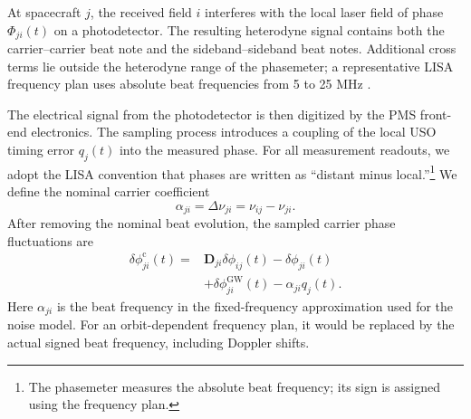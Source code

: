 At spacecraft $j$, the received field $i$ interferes with the local laser field of phase $\Phi_{ji}(t)$ on a photodetector. The resulting heterodyne signal contains both the carrier–carrier beat note and the sideband–sideband beat notes. Additional cross terms lie outside the heterodyne range of the phasemeter; a representative LISA frequency plan uses absolute beat frequencies from 5 to 25 MHz \cite{heinzel_frequency_2024}.

The electrical signal from the photodetector is then digitized by the \ac{PMS} front-end electronics. The sampling process introduces a coupling of the local USO timing error $q_j(t)$ into the measured phase.
For all measurement readouts, we adopt the LISA convention that phases are written as ``distant minus local.''\footnote{The phasemeter measures the absolute beat frequency; its sign is assigned using the frequency plan.} We define the nominal carrier coefficient
\begin{equation}
    \alpha_{ji}=\Delta\nu_{ji}=\nu_{ij}-\nu_{ji}.
\end{equation}
After removing the nominal beat evolution, the sampled carrier phase fluctuations are
\begin{equation}\label{Main_LISA_eq}
    \begin{aligned}
    \delta\phi^{\mathrm c}_{ji}(t)={}&\mathbf D_{ji}\delta\phi_{ij}(t)-\delta\phi_{ji}(t)\\
    &+\delta\phi^{\mathrm{GW}}_{ji}(t)-\alpha_{ji}q_j(t).
    \end{aligned}
\end{equation}
Here $\alpha_{ji}$ is the beat frequency in the fixed-frequency approximation used for the noise model. For an orbit-dependent frequency plan, it would be replaced by the actual signed beat frequency, including Doppler shifts.

